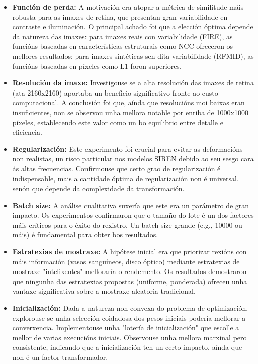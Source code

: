 \begin{itemize}
\item \textbf{Función de perda:} A motivación era atopar a métrica de similitude máis robusta para as imaxes de retina, que presentan gran variabilidade en contraste e iluminación. O principal achado foi que a elección óptima depende da natureza das imaxes: para imaxes reais con variabilidade (FIRE), as funcións baseadas en características estruturais como NCC ofreceron os mellores resultados; para imaxes sintéticas sen dita variabilidade (RFMID), as funcións baseadas en píxeles como L1 foron superiores.

\item \textbf{Resolución da imaxe:} Investigouse se a alta resolución das imaxes de retina (ata 2160x2160) aportaba un beneficio significativo fronte ao custo computacional. A conclusión foi que, aínda que resolucións moi baixas eran insuficientes, non se observou unha mellora notable por enriba de 1000x1000 píxeles, establecendo este valor como un bo equilibrio entre detalle e eficiencia.

\item \textbf{Regularización:} Este experimento foi crucial para evitar as deformacións non realistas, un risco particular nos modelos SIREN debido ao seu sesgo cara ás altas frecuencias. Confirmouse que certo grao de regularización é indispensable, mais a cantidade óptima de regularización non é universal, senón que depende da complexidade da transformación.

\item \textbf{Batch size:} A análise cualitativa suxería que este era un parámetro de gran impacto. Os experimentos confirmaron que o tamaño do lote é un dos factores máis críticos para o éxito do rexistro. Un batch size grande (e.g., 10000 ou máis) é fundamental para obter bos resultados.

\item \textbf{Estratexias de mostraxe:} A hipótese inicial era que priorizar rexións con máis información (vasos sanguíneos, disco óptico) mediante estratexias de mostraxe "intelixentes" melloraría o rendemento. Os resultados demostraron que ningunha das estratexias propostas (uniforme, ponderada) ofreceu unha vantaxe significativa sobre a mostraxe aleatoria tradicional.

\item \textbf{Inicialización:} Dada a natureza non convexa do problema de optimización, explorouse se unha selección coidadosa dos pesos iniciais podería mellorar a converxencia. Implementouse unha "lotería de inicialización" que escolle a mellor de varias execucións iniciais. Observouse unha mellora marxinal pero consistente, indicando que a inicialización ten un certo impacto, aínda que non é un factor transformador.


\end{itemize}
